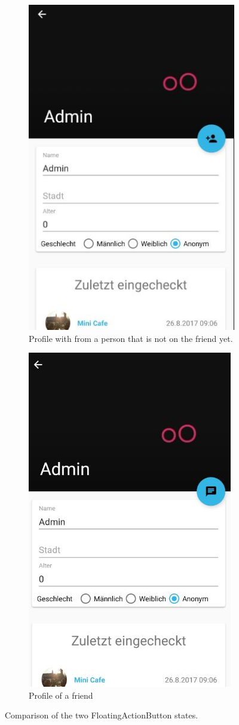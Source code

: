\begin{figure}
	\centering
	\begin{subfigure}{.5\textwidth}
		\centering
		\includegraphics[width=.4\linewidth]{images/profile_activity_one.jpg}
		\caption{Profile with from a person that is not on the friend yet.}
		\label{fig:profile_activity_one}
	\end{subfigure}%
	\begin{subfigure}{.5\textwidth}
		\centering
		\includegraphics[width=.4\linewidth]{images/profile_activity_three.jpg}
		\caption{Profile of a friend}
		\label{fig:profile_activity_three}
	\end{subfigure}
	\caption{Comparison of the two FloatingActionButton states.}
	\label{fig:fab_comparrison}
\end{figure}

